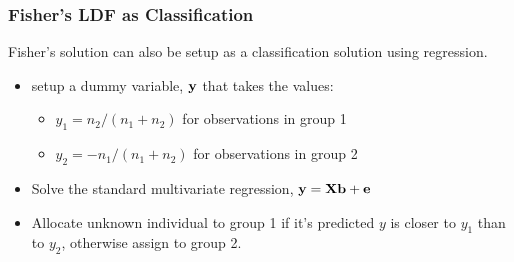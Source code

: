 \documentclass{beamer}
\begin{document}
\begin{frame}
  \frametitle{Fisher's LDF as Classification}

Fisher's solution can also be setup as a classification solution using regression.

\begin{itemize}
\item setup a dummy variable, $\mathbf{y}$ that takes the values:
\begin{itemize}
    \item $y_1 = n_2/(n_1 + n_2)$ for observations in group 1
    \item $y_2 = -n_1/(n_1 + n_2)$ for observations in group 2
\end{itemize}
\item Solve the standard multivariate regression, $\mathbf{y} = \mathbf{X}\mathbf{b} + \mathbf{e}$
\item Allocate unknown individual to group 1 if it's predicted $y$ is closer to $y_1$ than to $y_2$, otherwise assign to group 2.

\end{itemize}


\end{frame}
\end{document}
